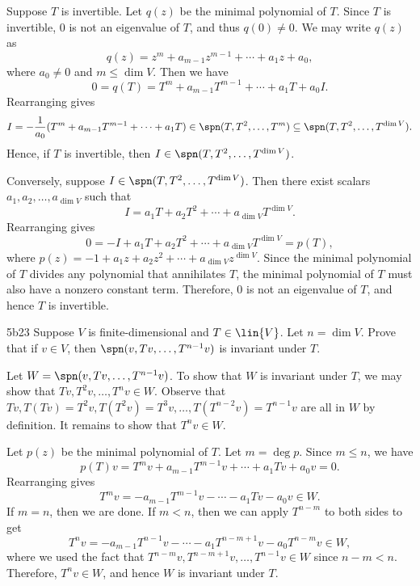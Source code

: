 \begin{sol}
    Suppose $T$ is invertible.
    Let $q(z)$ be the minimal polynomial of $T$.
    Since $T$ is invertible, $0$ is not an eigenvalue of $T$, and thus $q(0) \neq 0$.
    We may write $q(z)$ as
    \[
    	q(z) = z^m + a_{m-1} z^{m-1} + \cdots + a_1 z + a_0,
    \]
    where $a_0 \neq 0$ and $m \leq \dim V$.
    Then we have
    \[
    	0 = q(T) = T^m + a_{m-1} T^{m-1} + \cdots + a_1 T + a_0 I.
    \]
    Rearranging gives
    \[
    	I = -\frac{1}{a_0} (T^m + a_{m-1} T^{m-1} + \cdots + a_1 T) \in \spn(T, T^2, \ldots, T^m) \subseteq \spn(T, T^2, \ldots, T^{\dim V}).
    \]
    Hence, if $T$ is invertible, then $I \in \spn(T, T^2, \ldots, T^{\dim V})$.

    Conversely, suppose $I \in \spn(T, T^2, \ldots, T^{\dim V})$.
    Then there exist scalars $a_1, a_2, \ldots, a_{\dim V}$ such that
    \[
    	I = a_1 T + a_2 T^2 + \cdots + a_{\dim V} T^{\dim V}.
    \]
    Rearranging gives
    \[
    	0 = -I + a_1 T + a_2 T^2 + \cdots + a_{\dim V} T^{\dim V} = p(T),
    \]
    where $p(z) = -1 + a_1 z + a_2 z^2 + \cdots + a_{\dim V} z^{\dim V}$.
    Since the minimal polynomial of $T$ divides any polynomial that annihilates $T$, the minimal polynomial of $T$ must also have a nonzero constant term.
    Therefore, $0$ is not an eigenvalue of $T$, and hence $T$ is invertible.
\end{sol}

\begin{exercise}{5b23}
    Suppose $V$ is finite-dimensional and $T \in \lin{V}$.
	Let $n = \dim V$.
	Prove that if $v \in V$, then $\spn(v, Tv, \ldots, T^{n-1}v)$ is invariant under $T$.
\end{exercise}

\begin{sol}
    Let $W = \spn(v, Tv, \ldots, T^{n-1}v)$.
    To show that $W$ is invariant under $T$, we may show that $Tv, T^2v, \ldots, T^nv \in W$.
    Observe that $Tv, T(Tv) = T^2v, T(T^2v) = T^3v, \ldots, T(T^{n-2}v) = T^{n-1}v$ are all in $W$ by definition.
    It remains to show that $T^nv \in W$.

    Let $p(z)$ be the minimal polynomial of $T$.
    Let $m = \deg p$.
    Since $m \leq n$, we have
    \[
    	p(T)v = T^m v + a_{m-1} T^{m-1} v + \cdots + a_1 Tv + a_0 v = 0.
    \]
    Rearranging gives
    \[
    	T^m v = -a_{m-1} T^{m-1} v - \cdots - a_1 Tv - a_0 v \in W.
    \]
    If $m = n$, then we are done.
    If $m < n$, then we can apply $T^{n-m}$ to both sides to get
    \[
    	T^n v = -a_{m-1} T^{n-1} v - \cdots - a_1 T^{n-m+1} v - a_0 T^{n-m} v \in W,
    \]
    where we used the fact that $T^{n-m}v, T^{n-m+1}v, \ldots, T^{n-1}v \in W$ since $n-m < n$.
    Therefore, $T^nv \in W$, and hence $W$ is invariant under $T$.
\end{sol}

